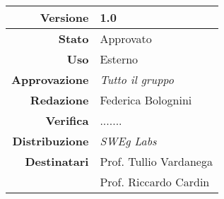\begin{center}
\begin{tabular}{r|l}
    \textbf{Versione} & 1.0 \\
    \hline
    \textbf{Stato} & Approvato \\
    \hline
    \textbf{Uso} & Esterno \\
    \hline
    \textbf{Approvazione} & \emph{Tutto il gruppo} \\
    \hline
    \textbf{Redazione} & Federica Bolognini \\
    \hline
    \textbf{Verifica} & ....... \\
    \hline
    \textbf{Distribuzione} & \emph{SWEg Labs} \\
    \hline
    \textbf{Destinatari} & Prof. Tullio Vardanega \\
                         & Prof. Riccardo Cardin \\
\end{tabular}
\end{center}

